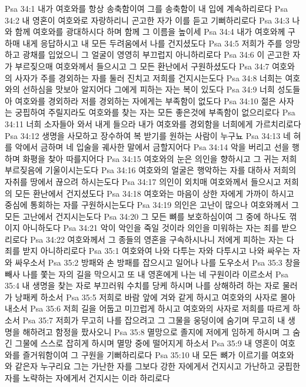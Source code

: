 Psa 34:1  내가 여호와를 항상 송축함이여 그를 송축함이 내 입에 계속하리로다
Psa 34:2  내 영혼이 여호와로 자랑하리니 곤고한 자가 이를 듣고 기뻐하리로다
Psa 34:3  나와 함께 여호와를 광대하시다 하며 함께 그 이름을 높이세
Psa 34:4  내가 여호와께 구하매 내게 응답하시고 내 모든 두려움에서 나를 건지셨도다
Psa 34:5  저희가 주를 앙망하고 광채를 입었으니 그 얼굴이 영영히 부끄럽지 아니하리로다
Psa 34:6  이 곤고한 자가 부르짖으매 여호와께서 들으시고 그 모든 환난에서 구원하셨도다
Psa 34:7  여호와의 사자가 주를 경외하는 자를 둘러 진치고 저희를 건지시는도다
Psa 34:8  너희는 여호와의 선하심을 맛보아 알지어다 그에게 피하는 자는 복이 있도다
Psa 34:9  너희 성도들아 여호와를 경외하라 저를 경외하는 자에게는 부족함이 없도다
Psa 34:10  젊은 사자는 궁핍하여 주릴지라도 여호와를 찾는 자는 모든 좋은것에 부족함이 없으리로다
Psa 34:11  너희 소자들아 와서 내게 들으라 내가 여호와를 경외함을 너희에게 가르치리로다
Psa 34:12  생명을 사모하고 장수하여 복 받기를 원하는 사람이 누구뇨
Psa 34:13  네 혀를 악에서 금하며 네 입술을 궤사한 말에서 금할지어다
Psa 34:14  악을 버리고 선을 행하며 화평을 찾아 따를지어다
Psa 34:15  여호와의 눈은 의인을 향하시고 그 귀는 저희 부르짖음에 기울이시는도다
Psa 34:16  여호와의 얼굴은 행악하는 자를 대하사 저희의 자취를 땅에서 끊으려 하시는도다
Psa 34:17  의인이 외치매 여호와께서 들으시고 저희의 모든 환난에서 건지셨도다
Psa 34:18  여호와는 마음이 상한 자에게 가까이 하시고 중심에 통회하는 자를 구원하시는도다
Psa 34:19  의인은 고난이 많으나 여호와께서 그 모든 고난에서 건지시는도다
Psa 34:20  그 모든 뼈를 보호하심이여 그 중에 하나도 꺾이지 아니하도다
Psa 34:21  악이 악인을 죽일 것이라 의인을 미워하는 자는 죄를 받으리로다
Psa 34:22  여호와께서 그 종들의 영혼을 구속하시나니 저에게 피하는 자는 다 죄를 받지 아니하리로다
Psa 35:1  여호와여 나와 다투는 자와 다투시고 나와 싸우는 자와 싸우소서
Psa 35:2  방패와 손 방패를 잡으시고 일어나 나를 도우소서
Psa 35:3  창을 빼사 나를 쫓는 자의 길을 막으시고 또 내 영혼에게 나는 네 구원이라 이르소서
Psa 35:4  내 생명을 찾는 자로 부끄러워 수치를 당케 하시며 나를 상해하려 하는 자로 물러가 낭패케 하소서
Psa 35:5  저희로 바람 앞에 겨와 같게 하시고 여호와의 사자로 몰아내소서
Psa 35:6  저희 길을 어둡고 미끄럽게 하시고 여호와의 사자로 저희를 따르게 하소서
Psa 35:7  저희가 무고히 나를 잡으려고 그 그물을 웅덩이에 숨기며 무고히 내 생명을 해하려고 함정을 팠사오니
Psa 35:8  멸망으로 졸지에 저에게 임하게 하시며 그 숨긴 그물에 스스로 잡히게 하시며 멸망 중에 떨어지게 하소서
Psa 35:9  내 영혼이 여호와를 즐거워함이여 그 구원을 기뻐하리로다
Psa 35:10  내 모든 뼈가 이르기를 여호와와 같은자 누구리요 그는 가난한 자를 그보다 강한 자에게서 건지시고 가난하고 궁핍한 자를 노략하는 자에게서 건지시는 이라 하리로다
